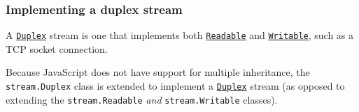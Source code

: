 \begin{Shaded}
\begin{Highlighting}[]
\OperatorTok{=} \NormalTok{(}\NormalTok{)}\OperatorTok{;}

    \OperatorTok{;}
     \OperatorTok{=} \OperatorTok{;}
     \OperatorTok{=} \OperatorTok{;}
\NormalTok{  \}}

  \NormalTok{() \{}
    \OperatorTok{=} \OperatorTok{++;}
    \OperatorTok{\textgreater{}} \NormalTok{)}
      \NormalTok{(}\NormalTok{)}\OperatorTok{;}
    \NormalTok{ \{}
      \OperatorTok{=} \OperatorTok{;}
      \OperatorTok{=} \OperatorTok{,} \NormalTok{)}\OperatorTok{;}
      \OperatorTok{;}
\NormalTok{    \}}
\NormalTok{  \}}
\NormalTok{\}}
\end{Highlighting}
\end{Shaded}

\subsubsection{Implementing a duplex
stream}\label{implementing-a-duplex-stream}

A \hyperref[class-streamduplex]{\texttt{Duplex}} stream is one that
implements both \hyperref[class-streamreadable]{\texttt{Readable}} and
\hyperref[class-streamwritable]{\texttt{Writable}}, such as a TCP socket
connection.

Because JavaScript does not have support for multiple inheritance, the
\texttt{stream.Duplex} class is extended to implement a
\hyperref[class-streamduplex]{\texttt{Duplex}} stream (as opposed to
extending the \texttt{stream.Readable} \emph{and}
\texttt{stream.Writable} classes).


